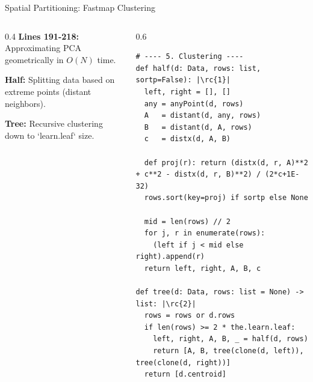 \begin{frame}[fragile]{Spatial Partitioning: Fastmap Clustering}
\begin{columns}[T]
  \begin{column}{0.4\textwidth}
    \footnotesize 
    \textbf{Lines 191-218:}\\
    Approximating PCA geometrically in $O(N)$ time.

    \vspace{0.2cm}
     \textbf{Half:} Splitting data based on extreme points (distant neighbors).
    
    \vspace{0.15cm}
     \textbf{Tree:} Recursive clustering down to `learn.leaf` size.
  \end{column}
  
  \begin{column}{0.6\textwidth}
\begin{verbatim}
# ---- 5. Clustering ----
def half(d: Data, rows: list, sortp=False): |\rc{1}|
  left, right = [], []
  any = anyPoint(d, rows)
  A   = distant(d, any, rows)
  B   = distant(d, A, rows)
  c   = distx(d, A, B)
  
  def proj(r): return (distx(d, r, A)**2 + c**2 - distx(d, r, B)**2) / (2*c+1E-32)
  rows.sort(key=proj) if sortp else None
  
  mid = len(rows) // 2
  for j, r in enumerate(rows):
    (left if j < mid else right).append(r)
  return left, right, A, B, c

def tree(d: Data, rows: list = None) -> list: |\rc{2}|
  rows = rows or d.rows
  if len(rows) >= 2 * the.learn.leaf:
    left, right, A, B, _ = half(d, rows)
    return [A, B, tree(clone(d, left)), tree(clone(d, right))]
  return [d.centroid]
\end{verbatim}
  \end{column}
\end{columns}
\end{frame}
